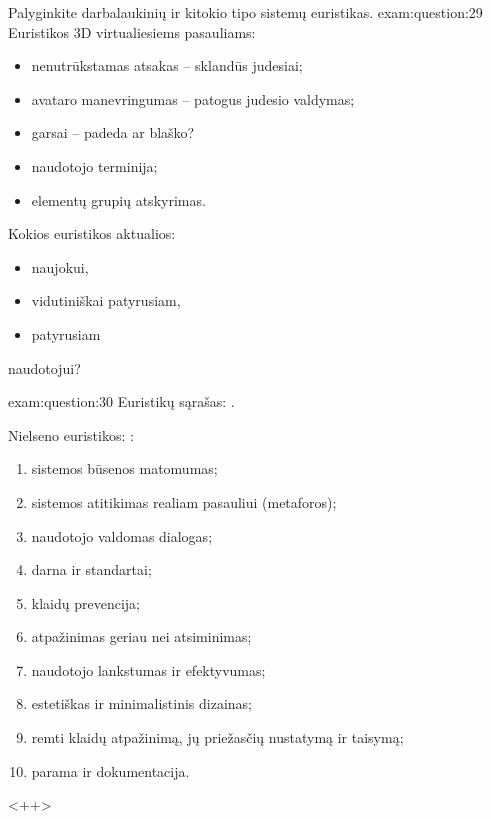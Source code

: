 \begin{question}{%
  Palyginkite darbalaukinių ir kitokio tipo sistemų euristikas.
  }{exam:question:29}
  Euristikos 3D virtualiesiems pasauliams:
  \begin{itemize}
    \item nenutrūkstamas atsakas – sklandūs judesiai;
    \item avataro manevringumas – patogus judesio valdymas;
    \item garsai – padeda ar blaško?
    \item naudotojo terminija;
    \item elementų grupių atskyrimas.
  \end{itemize}
\end{question}

\begin{question}{%
  Kokios euristikos aktualios:
  \begin{itemize}
    \item naujokui,
    \item vidutiniškai patyrusiam,
    \item patyrusiam
  \end{itemize}
  naudotojui?
  }{exam:question:30}
  Euristikų sąrašas: \cite[3]{skaidres-11}.

  Nielseno euristikos: \cite[6]{skaidres-11}:
  \begin{enumerate}
    \item sistemos būsenos matomumas;
    \item sistemos atitikimas realiam pasauliui (metaforos);
    \item naudotojo valdomas dialogas;
    \item darna ir standartai;
    \item klaidų prevencija;
    \item atpažinimas geriau nei atsiminimas;
    \item naudotojo lankstumas ir efektyvumas;
    \item estetiškas ir minimalistinis dizainas;
    \item remti klaidų atpažinimą, jų priežasčių nustatymą ir taisymą;
    \item parama ir dokumentacija.
  \end{enumerate}
  <++>
\end{question}
